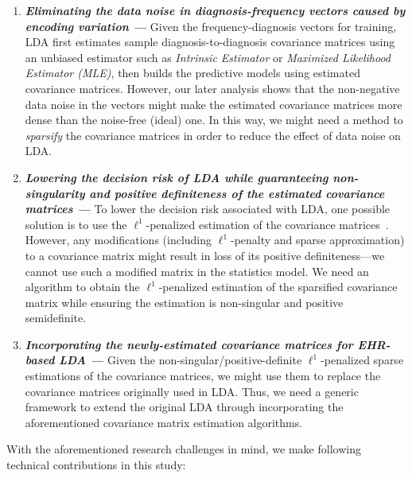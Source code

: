 \begin{enumerate} 
    \item 
    \textbf{\em Eliminating the data noise in diagnosis-frequency vectors caused by encoding variation --- }
Given the frequency-diagnosis vectors for training, LDA first estimates sample diagnosis-to-diagnosis covariance matrices using an unbiased estimator such as \emph{Intrinsic Estimator} or \emph{Maximized Likelihood Estimator (MLE)}, then builds the predictive models using estimated covariance matrices.
However, our later analysis shows that the non-negative data noise in the vectors might make the estimated covariance matrices more dense than the noise-free (ideal) one.
In this way, we might need a method to \emph{sparsify} the covariance matrices in order to reduce the effect of data noise on LDA.

\item \textbf{\em Lowering the decision risk of LDA while guaranteeing non-singularity and positive definiteness of the estimated covariance matrices --- } 
To lower the decision risk associated with LDA, one possible solution is to use the $\ell^1$-penalized estimation of the covariance matrices~\cite{cai2012minimax,xue2012positive}.
However, any modifications (including $\ell^1$-penalty and sparse approximation) to a covariance matrix might result in loss of its positive definiteness---we cannot use such a modified matrix in the statistics model.
We need an algorithm to obtain the $\ell^1$-penalized estimation of the sparsified covariance matrix while ensuring the estimation is non-singular and positive semidefinite.


\item \textbf{\em Incorporating the newly-estimated covariance matrices for EHR-based LDA --- }      
Given the non-singular/positive-definite $\ell^1$-penalized sparse estimations of the covariance matrices, we might use them to replace the covariance matrices originally used in LDA.
Thus, we need a generic framework to extend the original LDA through incorporating the aforementioned covariance matrix estimation algorithms.


\end{enumerate}
 
With the aforementioned research challenges in mind, we make following technical contributions in this study:

